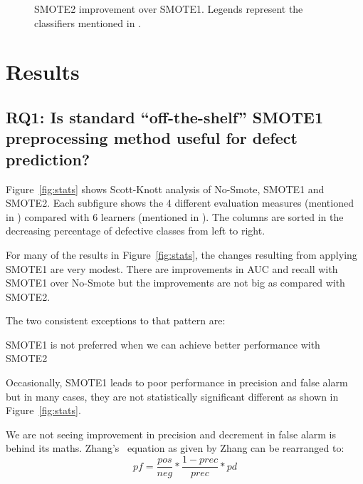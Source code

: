 \begin{figure}[!t]
    \caption{SMOTE2 improvement over SMOTE1. Legends represent the classifiers mentioned in .}
    \vspace{-10pt}
    \label{fig:tuned}
\end{figure}

\section{Results}
\label{sect:results}

\subsection{\textbf{RQ1: Is standard ``off-the-shelf'' SMOTE1 preprocessing method useful for defect prediction?}}

Figure~\ref{fig:stats} shows Scott-Knott analysis of No-Smote, SMOTE1 and SMOTE2. Each subfigure shows the 4 different evaluation measures (mentioned in ) compared with 6 learners (mentioned in ). The columns are sorted in the decreasing percentage of defective classes from left to right.

For many of the results in Figure~\ref{fig:stats}, the changes
resulting from applying SMOTE1 are very modest. There are improvements in AUC and recall with SMOTE1 over No-Smote but the improvements are not big as compared with SMOTE2.

The two consistent exceptions to that pattern are:
\bi
\item 
SMOTE1 is not preferred when we can achieve better performance with SMOTE2
\item 
Occasionally, SMOTE1 leads to poor performance in precision and false alarm but in many cases, they are not statistically significant different as shown in Figure~\ref{fig:stats}.  
\ei

We are not seeing improvement in precision and decrement in false alarm is behind its maths. Zhang's~\cite{menzies2007problems} equation as given by Zhang can be rearranged to:
\[
  \mathit{pf}=  \frac{pos}{neg} *\frac{1-\mathit{prec}}{\mathit{prec}}* \mathit{pd}\]

